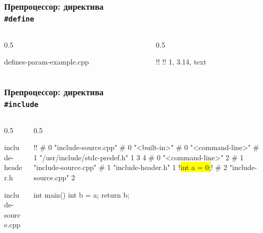 \documentclass[compress, 10pt, aspectratio=169]{beamer}
\begin{document}
\begin{frame}[fragile]

    \frametitle{Препроцессор: директива \\ \texttt{\#define}}

    \begin{columns}[T]

        \begin{column}{0.5\textwidth}

                {defines-param-example.cpp}

        \end{column}

        \begin{column}{0.5\textwidth}

            \begin{terminalwindow}
!!
!!
1, 3.14, text
            \end{terminalwindow}

        \end{column}

    \end{columns}

\end{frame}

\begin{frame}[fragile]

    \frametitle{Препроцессор: директива \\ \texttt{\#include}}

    \begin{columns}[T]

        \begin{column}{0.5\textwidth}

                {include-header.h}

                {include-source.cpp}

        \end{column}

        \begin{column}{0.5\textwidth}

            \begin{terminalwindow}
!!
# 0 "include-source.cpp"
# 0 "<built-in>"
# 0 "<command-line>"
# 1 "/usr/include/stdc-predef.h" 1 3 4
# 0 "<command-line>" 2
# 1 "include-source.cpp"
# 1 "include-header.h" 1
!\colorbox{yellow}{int a = 0;}!
# 2 "include-source.cpp" 2

int main() {
    int b = a;
    return b;
}
            \end{terminalwindow}

        \end{column}

    \end{columns}

\end{frame}
\end{document}
